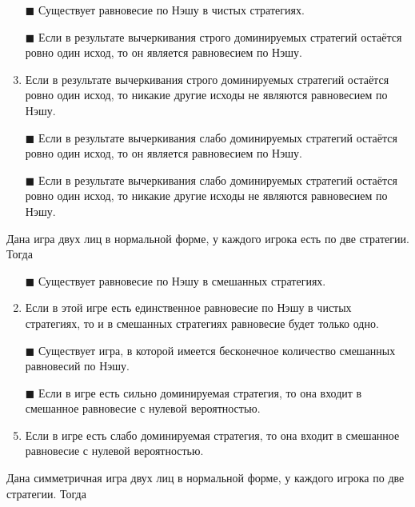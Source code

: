 \begin{enumerate}[label=$\square$]
	\item[$\blacksquare$] Существует равновесие по Нэшу в чистых стратегиях.
	\item[$\blacksquare$] Если в результате вычеркивания строго доминируемых стратегий остаётся ровно один исход, то он является равновесием по Нэшу.
	\item Если в результате вычеркивания строго доминируемых стратегий остаётся ровно один исход, то никакие другие исходы не являются равновесием по Нэшу.
	\item[$\blacksquare$] Если в результате вычеркивания слабо доминируемых стратегий остаётся ровно один исход, то он является равновесием по Нэшу.
	\item[$\blacksquare$] Если в результате вычеркивания слабо доминируемых стратегий остаётся ровно один исход, то никакие другие исходы не являются равновесием по Нэшу.
\end{enumerate}

\task
Дана игра двух лиц в нормальной форме, у каждого игрока есть по две стратегии. Тогда
\begin{enumerate}[label=$\square$]	%
	\item[$\blacksquare$] Существует равновесие по Нэшу в смешанных стратегиях.
	\item Если в этой игре есть единственное равновесие по Нэшу в чистых стратегиях, то и в смешанных стратегиях равновесие будет только одно.
	\item[$\blacksquare$] Существует игра, в которой имеется бесконечное количество смешанных равновесий по Нэшу.
	\item[$\blacksquare$] Если в игре есть сильно доминируемая стратегия, то она входит в смешанное равновесие с нулевой вероятностью.
	\item Если в игре есть слабо доминируемая стратегия, то она входит в смешанное равновесие с нулевой вероятностью.
\end{enumerate}

\task
Дана симметричная игра двух лиц в нормальной форме, у каждого игрока по две стратегии. Тогда

